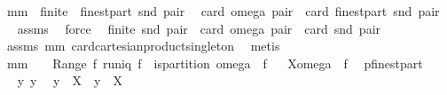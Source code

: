 \begin{isabellebody}
%
\endisadelimproof
\isanewline
\isanewline
\isanewline
\isanewline
{}\isamarkupfalse%
\ mm{}{}{\isacharcolon}\ \ {\isachardoublequoteopen}finite\ \ {\isacharparenleft}finestpart\ {\isacharparenleft}snd\ pair{\isacharparenright}{\isacharparenright}{\isachardoublequoteclose}\ \ \isanewline
{\isachardoublequoteopen}card\ {\isacharparenleft}omega\ pair{\isacharparenright}\ {\isacharequal}\ card\ {\isacharparenleft}finestpart\ {\isacharparenleft}snd\ pair{\isacharparenright}{\isacharparenright}{\isachardoublequoteclose}%
\isadelimproof
\ %
\endisadelimproof
%
\isatagproof
{}\isamarkupfalse%
\ assms\ \isamarkupfalse%
\ force%
\endisatagproof
{\isafoldproof}%
%
\isadelimproof
%
\endisadelimproof
\isanewline
\isanewline
{}\isamarkupfalse%
\ \ {\isachardoublequoteopen}finite\ {\isacharparenleft}snd\ pair{\isacharparenright}{\isachardoublequoteclose}\ \ {\isachardoublequoteopen}card\ {\isacharparenleft}omega\ pair{\isacharparenright}\ {\isacharequal}\ card\ {\isacharparenleft}snd\ pair{\isacharparenright}{\isachardoublequoteclose}\ \isanewline
%
\isadelimproof
%
\endisadelimproof
%
\isatagproof
{}\isamarkupfalse%
\ assms\ mm{}{}\ card{\isacharunderscore}cartesian{\isacharunderscore}product{\isacharunderscore}singleton\ \isamarkupfalse%
\ metis%
\endisatagproof
{\isafoldproof}%
%
\isadelimproof
\isanewline
%
\endisadelimproof
\isanewline
{}\isamarkupfalse%
\ mm{}{}{\isacharcolon}\ \ {\isachardoublequoteopen}{\isacharbraceleft}{\isacharbraceright}\ {\isasymnotin}\ Range\ f{\isachardoublequoteclose}\ {\isachardoublequoteopen}runiq\ f{\isachardoublequoteclose}\ \ {\isachardoublequoteopen}is{\isacharunderscore}partition\ {\isacharparenleft}omega\ {\isacharbackquote}\ f{\isacharparenright}{\isachardoublequoteclose}\isanewline
%
\isadelimproof
\isanewline
%
\endisadelimproof
%
\isatagproof
{}\isamarkupfalse%
\ {\isacharminus}\isanewline
{}\isamarkupfalse%
\ {\isacharquery}X{\isacharequal}{\isachardoublequoteopen}omega\ {\isacharbackquote}\ f{\isachardoublequoteclose}\ \isamarkupfalse%
\ {\isacharquery}p{\isacharequal}finestpart\isanewline
\ \ \isacommand{{\isacharbraceleft}}\isamarkupfalse%
\ \isamarkupfalse%
\ y{}\ y{}\ \isamarkupfalse%
\ {\isachardoublequoteopen}y{}\ {\isasymin}\ {\isacharquery}X\ {\isacharampersand}\ y{}\ {\isasymin}\ {\isacharquery}X{\isachardoublequoteclose}\isanewline

\end{isabellebody}

